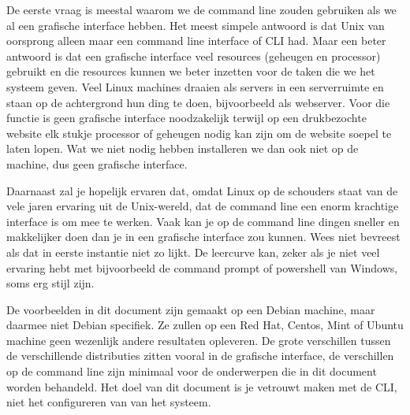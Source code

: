 De eerste vraag is meestal waarom we de command line zouden gebruiken als we al een grafische interface hebben. Het meest simpele antwoord is dat Unix van oorsprong alleen maar een command line interface of CLI had. Maar een beter antwoord is dat een grafische interface veel resources (geheugen en processor) gebruikt en die resources kunnen we beter inzetten voor de taken die we het systeem geven. Veel Linux machines draaien als servers in een serverruimte en staan op de achtergrond hun ding te doen, bijvoorbeeld als webserver. Voor die functie is geen grafische interface noodzakelijk terwijl op een drukbezochte website elk stukje processor of geheugen nodig kan zijn om de website soepel te laten lopen. Wat we niet nodig hebben installeren we dan ook niet op de machine, dus geen grafische interface.

Daarnaast zal je hopelijk ervaren dat, omdat Linux op de schouders staat van de vele jaren ervaring uit de Unix-wereld, dat de command line een enorm krachtige interface is om mee te werken. Vaak kan je op de command line dingen sneller en makkelijker doen dan je in een grafische interface zou kunnen. Wees niet bevreest als dat in eerste instantie niet zo lijkt. De leercurve kan, zeker als je niet veel ervaring hebt met bijvoorbeeld de command prompt of powershell van Windows, soms erg stijl zijn.

De voorbeelden in dit document zijn gemaakt op een Debian machine, maar daarmee niet Debian specifiek. Ze zullen op een Red Hat, Centos, Mint of Ubuntu machine geen wezenlijk andere resultaten opleveren. De grote verschillen tussen de verschillende distributies zitten vooral in de grafische interface, de verschillen op de command line zijn minimaal voor de onderwerpen die in dit document worden behandeld. Het doel van dit document is je vetrouwt maken met de CLI, niet het configureren van van het systeem.

